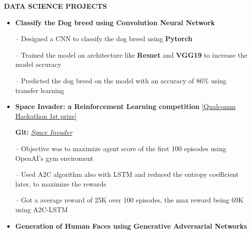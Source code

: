 \documentclass{article}
\def\vsp{4pt}
\begin{document}
\vspace{\vsp}
 \begin{theorem}
   \vspace{-0.7mm}
\begin{center}
\textbf{DATA SCIENCE PROJECTS
}\end{center}  
  
   \end{theorem}
\vspace{-1mm}
\begin{itemize}
\setlength{\itemsep}{-0.15em}
\item \textbf{Classify the Dog breed using Convolution Neural Network} %


\item[--] Designed a CNN to classify the dog breed using \textbf{Pytorch}
\item[--] Trained the model on architecture like \textbf{Resnet} and \textbf{VGG19} to increase the model accuracy
\item[--] Predicted the dog breed on the model with an accuracy of 86\% using transfer learning 



\item \textbf{Space Invader: a Reinforcement Learning competition}
\hfill{\href{https://drive.google.com/file/d/13voQkZ9kiybTD-pCkeTBRxmi9IeBtqnG/view?usp=sharing}{[Qualcomm Hackathon 1st prize]}}

\textbf{Git:} \href{https://github.com/153079019shariq/Space_Invader_RL} {\textit{Space Invader}}
\item[--] Objective was to maximize agent score of the first 100 episodes using OpenAI's gym enviroment
\item[--] Used A2C algorithm also with LSTM and reduced the entropy coefficient later, to maximize the rewards
\item[--] Got a average reward of 25K over 100 episodes, the max reward being 69K using A2C-LSTM



\item \textbf{Generation of Human Faces using Generative Adversarial Networks} %


\end{itemize}
\end{document}
